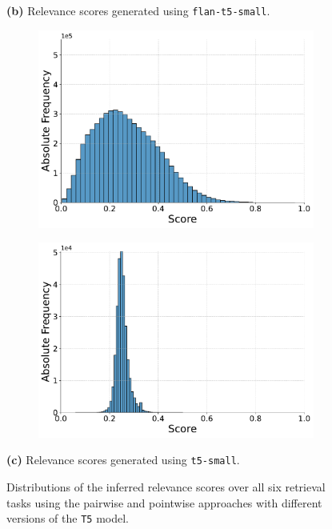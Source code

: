 \begin{figure}[ht!]
    \vspace{-0.5cm}
    \textbf{(b)} Relevance scores generated using \texttt{flan-t5-small}.
    \vspace{0.5cm}

    \begin{subfigure}[b]{0.49\textwidth}
        \centering
        \includegraphics[width=\textwidth]{graphics/seaborn/pairwise_cw22_score_distribution_t5-small.pdf}
        \label{fig:pairwise_t5-small}
    \end{subfigure}
    \hfill
    \begin{subfigure}[b]{0.49\textwidth}
        \centering
        \includegraphics[width=\textwidth]{graphics/seaborn/pointwise_cw22_score_distribution_t5-small.pdf}
        \label{fig:pointwise_t5-small}
    \end{subfigure}

    \vspace{-0.5cm}
    \textbf{(c)} Relevance scores generated using \texttt{t5-small}.
    \vspace{0.5cm}

    \caption{Distributions of the inferred relevance scores over all six retrieval tasks using the pairwise and pointwise approaches with different versions of the \texttt{T5} model.}
    \label{fig:score-distributions}
\end{figure}